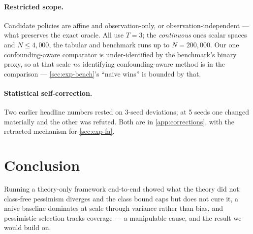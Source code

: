 \documentclass{article}
\theoremstyle{plain}
\theoremstyle{definition}
\begin{document}
\paragraph{Restricted scope.} Candidate policies are affine and
observation-only, or observation-independent --- what preserves the exact oracle.
All use $T{=}3$; the \emph{continuous} ones scalar spaces and $N\le4{,}000$, the
tabular and benchmark runs up to $N=200{,}000$. Our one confounding-aware
comparator is under-identified by the benchmark's binary proxy, so at that scale
\emph{no} identifying confounding-aware method is in the comparison ---
\cref{sec:exp-bench}'s ``naive wins'' is bounded by that.

\paragraph{Statistical self-correction.} Two earlier headline numbers rested on
3-seed deviations; at 5 seeds one changed materially and the other was refuted.
Both are in \cref{app:corrections}, with the retracted mechanism for
\cref{sec:exp-fa}.

\section{Conclusion}

Running a theory-only framework end-to-end showed what the theory did not:
class-free pessimism diverges and the class bound caps but does not cure it, a
naive baseline dominates at scale through variance rather than bias, and
pessimistic selection tracks coverage --- a manipulable cause, and the result we
would build on.




\newpage
\appendix
\onecolumn

\end{document}
